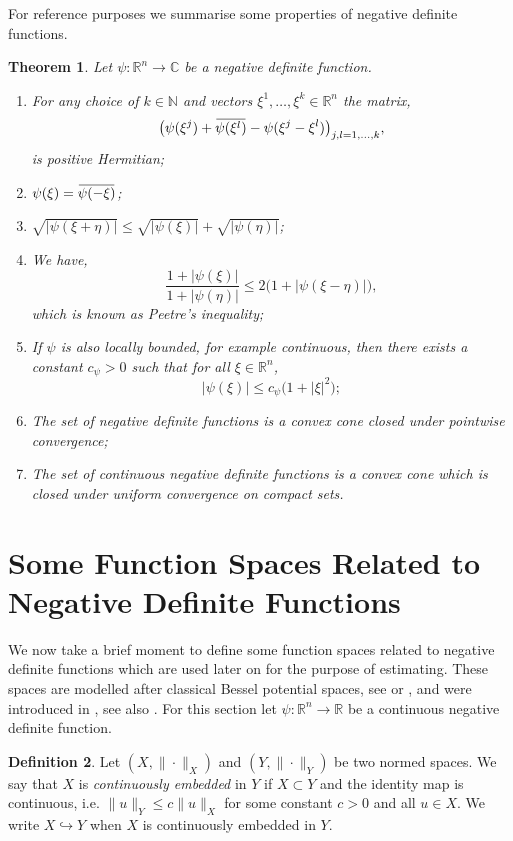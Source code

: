 \documentclass[a4paper, 12pt]{report}
\newtheorem{theorem}{Theorem}[section]
\theoremstyle{cor}
\theoremstyle{remark}
\theoremstyle{definition}
\newtheorem{defn}[theorem]{Definition}
\newcommand{\overbar}[1]{\mkern 1.5mu\overline{\mkern-1.5mu#1\mkern-1.5mu}\mkern 1.5mu}
\begin{document}
For reference purposes we summarise some properties of negative definite functions.
\begin{theorem}\label{FTaSNDFT1}
Let $\psi : \mathbb{R}^n \to \mathbb{C}$ be a negative definite function.
\begin{enumerate}
\item For any choice of $k \in \mathbb{N}$ and vectors $\xi^1, \dots, \xi^k \in \mathbb{R}^n$ the matrix,
$$
\big(\psi(\xi^j) + \overbar{\psi(\xi^l)} - \psi(\xi^j - \xi^l)\big)_{j, l = 1, \dots, k},
$$
is positive Hermitian;

\item $\psi(\xi) = \overbar{\psi(-\xi)}$;

\item $\sqrt{|\psi(\xi + \eta)|} \le \sqrt{|\psi(\xi)|} + \sqrt{|\psi(\eta)|}$;

\item We have,
$$
\frac{1 + |\psi(\xi)|}{1 + |\psi(\eta)|} \le 2\big(1 + |\psi(\xi - \eta)|\big),
$$
which is known as Peetre's inequality;

\item If $\psi$ is also locally bounded, for example continuous, then there exists a constant $c_\psi > 0$ such that for all $\xi \in \mathbb{R}^n$,
$$
|\psi(\xi)| \le c_\psi\big(1 + |\xi|^2\big);
$$

\item The set of negative definite functions is a convex cone closed under pointwise convergence;

\item The set of continuous negative definite functions is a convex cone which is closed under uniform convergence on compact sets.
\end{enumerate}
\end{theorem}


\section{Some Function Spaces Related to Negative Definite Functions}

We now take a brief moment to define some function spaces related to negative definite functions which are used later on for the purpose of estimating.  These spaces are modelled after classical Bessel potential spaces, see \cite{I.1} or \cite{II.256}, and were introduced in \cite{II.256}, see also \cite{II.87}.  For this section let $\psi : \mathbb{R}^n \to \mathbb{R}$ be a continuous negative definite function.
\begin{defn}
Let $(X, \|\cdot\|_X)$ and $(Y, \|\cdot\|_Y)$ be two normed spaces.  We say that $X$ is \emph{continuously embedded} in $Y$ if $X \subset Y$ and the identity map is continuous, i.e. $\|u\|_Y \le c\|u\|_X$ for some constant $c > 0$ and all $u \in X$.  We write $X \hookrightarrow Y$ when $X$ is continuously embedded in $Y$.
\end{defn}
\end{document}

